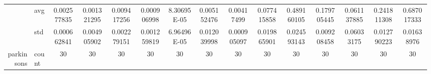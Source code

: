 \begin{table}[htbp]
{\begin{tabular}{rlccc|c|c|c|c|c|ccccc}
			                                                                               & avg                & \cellcolor[rgb]{ .549,  .792,  .49}0.002577835                                 & \cellcolor[rgb]{ .467,  .765,  .486}0.001321295                                & \cellcolor[rgb]{ 1,  .922,  .518}0.009417256                                   & \cellcolor[rgb]{ .439,  .757,  .482}0.000906998 & \cellcolor[rgb]{ .388,  .745,  .482}\textcolor[rgb]{ 0,  .38,  0}{8.30695E-05} & \cellcolor[rgb]{ .718,  .839,  .498}0.005152476 & \cellcolor[rgb]{ .655,  .82,  .494}0.00417499                                  & \cellcolor[rgb]{ 1,  .871,  .51}0.077415858     & \cellcolor[rgb]{ .984,  .561,  .451}0.489160105 & \cellcolor[rgb]{ .996,  .796,  .494}0.179705445 & \cellcolor[rgb]{ 1,  .886,  .514}0.061137885    & \cellcolor[rgb]{ .992,  .749,  .486}0.241811308 & \cellcolor[rgb]{ .973,  .412,  .42}0.687017333  \\
			                                                                               & std                & 0.000662841                                                                    & 0.004905902                                                                    & 0.002279151                                                                    & 0.001259819                                     & 6.96496E-05                                                                    & 0.012039998                                     & 0.000905097                                                                    & 0.019865901                                     & 0.024593143                                     & 0.009208458                                     & 0.06033175                                      & 0.012790223                                     & 0.01638976                                      \\
			parkinsons                                                                     & count              & 30                                                                             & 30                                                                             & 30                                                                             & 30                                              & 30                                                                             & 30                                              & 30                                                                             & 30                                              & 30                                              & 30                                              & 30                                              & 30                                              & 30                                              \\

\end{tabular}}
\end{table}
